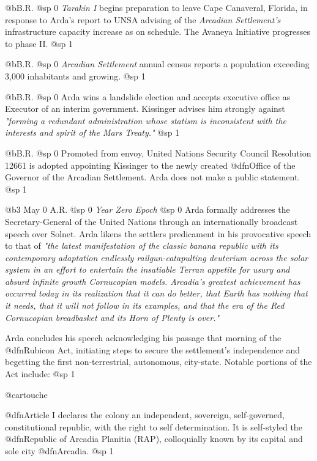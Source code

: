 @b{B.R.}
@sp 0
{\it Tarakin I} begins preparation to leave Cape Canaveral, Florida, in response to Arda's report to UNSA advising of the {\it Arcadian Settlement's} infrastructure capacity increase as on schedule. The Avaneya Initiative progresses to phase II.
@sp 1

@b{B.R.}
@sp 0
{\it Arcadian Settlement} annual census reports a population exceeding 3,000 inhabitants and growing.
@sp 1

@b{B.R.}
@sp 0
Arda wins a landslide election and accepts executive office as Executor of an interim government. Kissinger advises him strongly against {\it "forming a redundant administration whose statism is inconsistent with the interests and spirit of the Mars Treaty."}
@sp 1

@b{B.R.}
@sp 0
Promoted from envoy, United Nations Security Council Resolution 12661 is adopted appointing Kissinger to the newly created @dfn{Office of the Governor of the Arcadian Settlement}. Arda does not make a public statement.
@sp 1

@b{3 May 0 A.R.}
@sp 0
{\it Year Zero Epoch}
@sp 0
Arda formally addresses the Secretary-General of the United Nations through an internationally broadcast speech over Solnet. Arda likens the settlers predicament in his provocative speech to that of {\it "the latest manifestation of the classic banana republic with its contemporary adaptation endlessly railgun-catapulting deuterium across the solar system in an effort to entertain the insatiable Terran appetite for usury and absurd infinite growth Cornucopian models. Arcadia's greatest achievement has occurred today in its realization that it can do better, that Earth has nothing that it needs, that it will not follow in its examples, and that the era of the Red Cornucopian breadbasket and its Horn of Plenty is over."}

Arda concludes his speech acknowledging his passage that morning of the @dfn{Rubicon Act}, initiating steps to secure the settlement's independence and begetting the first non-terrestrial, autonomous, city-state. Notable portions of the Act include:
@sp 1

@cartouche
\itemize
\item
@dfn{Article I} declares the colony an independent, sovereign, self-governed, constitutional republic, with the right to self determination. It is self-styled the @dfn{Republic of Arcadia Planitia (RAP)}, colloquially known by its capital and sole city @dfn{Arcadia}.
@sp 1

